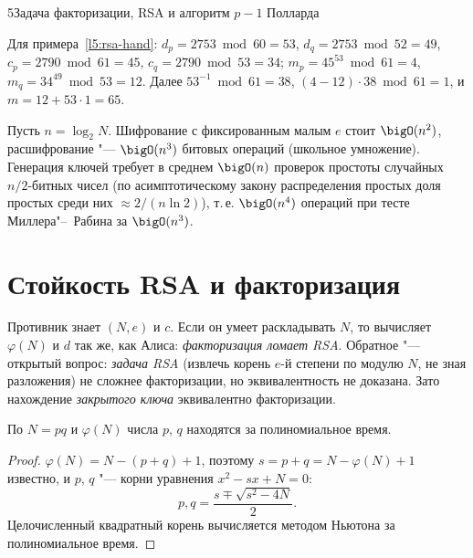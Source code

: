 \begin{lecture}{5}{Задача факторизации, RSA и алгоритм \texorpdfstring{$p - 1$}{p - 1} Полларда}
\begin{example}
Для примера~\ref{l5:rsa-hand}: $d_p = 2753 \bmod 60 = 53$, $d_q = 2753 \bmod 52 = 49$,
$c_p = 2790 \bmod 61 = 45$, $c_q = 2790 \bmod 53 = 34$; $m_p = 45^{53} \bmod 61 = 4$,
$m_q = 34^{49} \bmod 53 = 12$. Далее $53^{-1} \bmod 61 = 38$,
$(4 - 12) \cdot 38 \bmod 61 = 1$, и $m = 12 + 53 \cdot 1 = 65$.
\end{example}


\begin{proposition}
Пусть $n = \log_2 N$. Шифрование с фиксированным малым $e$ стоит $\bigO(n^2)$, расшифрование "---
$\bigO(n^3)$ битовых операций (школьное умножение). Генерация ключей требует в среднем
$\bigO(n)$ проверок простоты случайных $n/2$-битных чисел (по асимптотическому закону
распределения простых доля простых среди них $\approx 2/(n \ln 2)$), т.\,е. $\bigO(n^4)$
операций при тесте Миллера"--~Рабина за $\bigO(n^3)$.
\end{proposition}


\section{Стойкость RSA и факторизация}

Противник знает $(N, e)$ и $c$. Если он умеет раскладывать $N$, то вычисляет $\varphi(N)$ и
$d$ так же, как Алиса: \emph{факторизация ломает RSA}. Обратное "--- открытый вопрос:
\emph{задача RSA} (извлечь корень $e$-й степени по модулю $N$, не зная разложения) не
сложнее факторизации, но эквивалентность не доказана. Зато нахождение \emph{закрытого
ключа} эквивалентно факторизации.

\begin{proposition}\label{l5:phi-factor}
По $N = pq$ и $\varphi(N)$ числа $p$, $q$ находятся за полиномиальное время.
\end{proposition}

\begin{proof}
$\varphi(N) = N - (p + q) + 1$, поэтому $s = p + q = N - \varphi(N) + 1$ известно, и $p$, $q$ "---
корни уравнения $x^2 - s x + N = 0$:
\[
  p, q = \frac{s \mp \sqrt{s^2 - 4N}}{2}.
\]
Целочисленный квадратный корень вычисляется методом Ньютона за полиномиальное время.
\end{proof}


\end{lecture}
